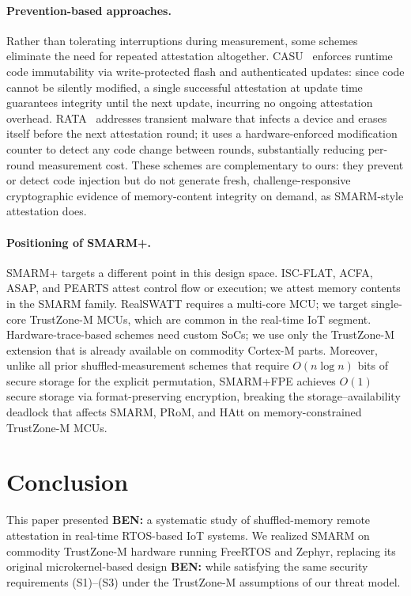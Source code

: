 \documentclass{ieeeaccess}
\DeclareRobustCommand{\ben}[1]{{\color{BENcolor}\textbf{BEN:} #1}}
\newcommand{\rtsmarm}{SMARM+\xspace}
\newcommand{\rtsmarmtwo}{SMARM+FPE\xspace}
\begin{document}
{\paragraph{Prevention-based approaches.}
Rather than tolerating interruptions during measurement,
some schemes eliminate the need for repeated attestation
altogether. CASU~\cite{casu} enforces runtime code
immutability via write-protected flash and authenticated
updates: since code cannot be silently modified, a single
successful attestation at update time guarantees integrity
until the next update, incurring no ongoing attestation
overhead. RATA~\cite{rata} addresses transient malware
that infects a device and erases itself before the next
attestation round; it uses a hardware-enforced modification
counter to detect any code change between rounds, substantially
reducing per-round measurement cost. These schemes are
complementary to ours: they prevent or detect code injection
but do not generate fresh, challenge-responsive
cryptographic evidence of memory-content integrity on demand,
as SMARM-style attestation does.

\paragraph{Positioning of \rtsmarm.}
\rtsmarm targets a different point in this design space.
ISC-FLAT, ACFA, ASAP, and PEARTS attest control flow or
execution; we attest memory contents in the SMARM family.
RealSWATT requires a multi-core MCU; we target single-core
TrustZone-M MCUs, which are common in the real-time IoT
segment. Hardware-trace-based schemes need custom SoCs;
we use only the TrustZone-M extension that is already
available on commodity Cortex-M parts. Moreover, unlike all prior shuffled-measurement schemes that require $O(n \log n)$ bits of secure storage for the explicit permutation, \rtsmarmtwo achieves $O(1)$ secure
storage via format-preserving encryption, breaking the
storage--availability deadlock that affects SMARM, PRoM,
and HAtt on memory-constrained TrustZone-M MCUs.
}


\section{Conclusion}
\label{sec:conclusion}

This paper presented \ben{a systematic study} of shuffled-memory remote attestation in real-time RTOS-based IoT systems. We realized SMARM on commodity TrustZone-M hardware running FreeRTOS and Zephyr, replacing its original microkernel-based design \ben{while satisfying the same security requirements (S1)--(S3) under the TrustZone-M assumptions of our threat model}.
\end{document}
